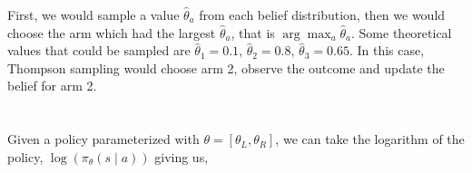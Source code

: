 \documentclass[11pt]{article}
\begin{document}
\begin{enumerate}[label=\alph*)]
    First, we would sample a value $\hat{\theta}_a$ from each belief distribution, then we would choose the arm which had the largest $\hat{\theta}_a$, that is $\arg\max_a \hat{\theta}_a$.
        Some theoretical values that could be sampled are $\hat{\theta}_1 = 0.1$, $\hat{\theta}_2 = 0.8$, $\hat{\theta}_3 = 0.65$. In this case, Thompson sampling would choose arm 2, observe the outcome and update the belief for arm 2.  
\end{enumerate}




\section{}
Given a policy parameterized with $\theta = [\theta_L,\theta_R]$, we can take the logarithm of the policy, 
$\log(\pi_\theta(s\mid a))$ giving us,
\end{document}
